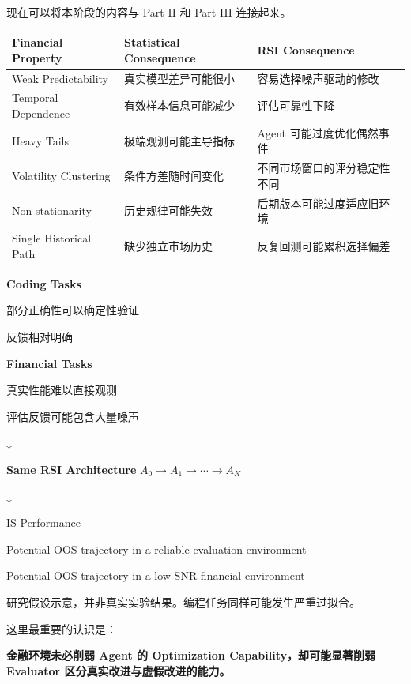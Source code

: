 现在可以将本阶段的内容与 Part II 和 Part III 连接起来。

\begin{readertable}
\begin{longtable}[]{@{}
  >{\raggedright\arraybackslash}p{}
  >{\raggedright\arraybackslash}p{}
  >{\raggedright\arraybackslash}p{}@{}}
\toprule
Financial Property & Statistical Consequence & RSI Consequence \\
\midrule
\endhead
Weak Predictability & 真实模型差异可能很小 & 容易选择噪声驱动的修改 \\
Temporal Dependence & 有效样本信息可能减少 & 评估可靠性下降 \\
Heavy Tails & 极端观测可能主导指标 & Agent 可能过度优化偶然事件 \\
Volatility Clustering & 条件方差随时间变化 & 不同市场窗口的评分稳定性不同 \\
Non-stationarity & 历史规律可能失效 & 后期版本可能过度适应旧环境 \\
Single Historical Path & 缺少独立市场历史 & 反复回测可能累积选择偏差 \\
\bottomrule
\end{longtable}
\end{readertable}

\textbf{Coding Tasks}

部分正确性可以确定性验证

反馈相对明确

\textbf{Financial Tasks}

真实性能难以直接观测

评估反馈可能包含大量噪声

↓

\textbf{Same RSI Architecture} \(A_0\rightarrow A_1\rightarrow\cdots\rightarrow A_K\)

↓


IS Performance

Potential OOS trajectory in a reliable evaluation environment

Potential OOS trajectory in a low-SNR financial environment

研究假设示意，并非真实实验结果。编程任务同样可能发生严重过拟合。

这里最重要的认识是：

\textbf{金融环境未必削弱 Agent 的 Optimization Capability，却可能显著削弱 Evaluator 区分真实改进与虚假改进的能力。}

